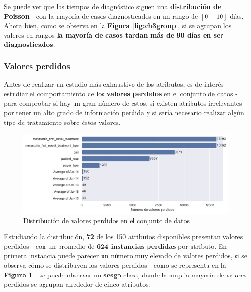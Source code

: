 Se puede ver que los tiempos de diagnóstico siguen una \textbf{distribución de Poisson} - con la mayoría de casos diagnosticados en un rango de $[0-10]$ días. Ahora bien, como se observa en la \textbf{Figura \ref{fig:ch3group}}, si se agrupan los valores en rangos \textbf{la mayoría de casos tardan más de 90 días en ser diagnosticados}.

\subsubsection{Valores perdidos}

Antes de realizar un estudio más exhaustivo de los atributos, es de interés estudiar el comportamiento de los \textbf{valores perdidos} en el conjunto de datos - para comprobar si hay un gran número de éstos, si existen atributos irrelevantes por tener un alto grado de información perdida y si sería necesario realizar algún tipo de tratamiento sobre éstos valores.

\begin{figure}[h]
	\centering
	\includegraphics[width=\linewidth]{figs/chapter3/missingvalues}
	\captionsetup{belowskip=-15pt}
	\caption{Distribución de valores perdidos en el conjunto de datos}
	\label{fig:ch3missingvalues}
\end{figure}

Estudiando la distribución, \textbf{72} de los 150 atributos disponibles presentan valores perdidos - con un promedio de \textbf{624 instancias perdidas} por atributo. En primera instancia puede parecer un número muy elevado de valores perdidos, si se observa cómo se distribuyen los valores perdidos - como se representa en la \textbf{Figura \ref{fig:ch3missingvalues}} - se puede observar un \textbf{sesgo} claro, donde la amplia mayoría de valores perdidos se agrupan alrededor de cinco atributos:

